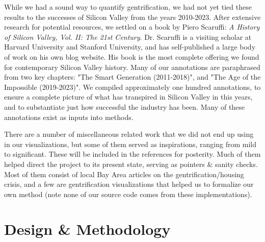 \documentclass{article}
\begin{document}
    While we had a sound way to quantify gentrification, we had not yet tied these results to the successes of Silicon Valley from the years 2010-2023. After extensive research for potential resources, we settled on a book by Piero Scaruffi: \textit{A History of Silicon Valley, Vol. II: The 21st Century}. Dr. Scaruffi is a visiting scholar at Harvard University and Stanford University, and has self-published a large body of work on his own blog website. His book is the most complete offering we found for contemporary Silicon Valley history. Many of our annotations are paraphrased from two key chapters: "The Smart Generation (2011-2018)", and "The Age of the Impossible (2019-2023)". We compiled approximately one hundred annotations, to ensure a complete picture of what has transpired in Silicon Valley in this years, and to substantiate just how successful the industry has been. Many of these annotations exist as inputs into  methods.
    
    There are a number of miscellaneous related work that we did not end up using in our visualizations, but some of them served as inspirations, ranging from mild to significant. These will be included in the references for posterity. Much of them helped direct the project to its present state, serving as pointers \& sanity checks. Most of them consist of local Bay Area articles on the gentrification/housing crisis, and a few are gentrification visualizations that helped us to formalize our own method (note none of our source code comes from these implementations).

\section{Design \& Methodology} \label{design}
   
\end{document}
